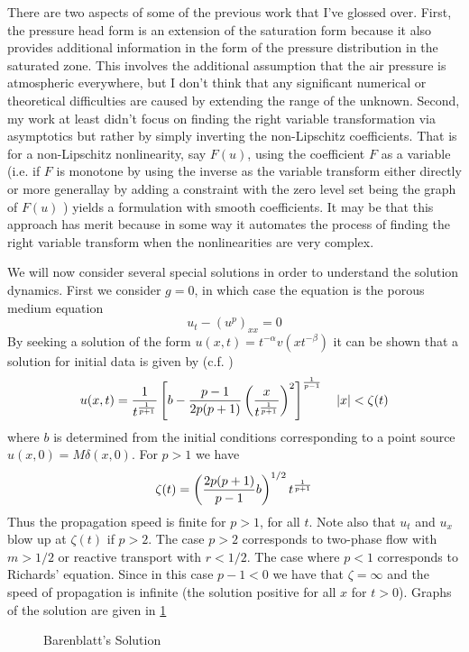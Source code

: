 \documentclass[10pt,dvips,twoside,reqno]{amsart}
\begin{document}
There are two aspects of some of the previous work that I've glossed
over. First, the pressure head form is an extension of the saturation
form because it also provides additional information in the form of
the pressure distribution in the saturated zone. This involves the
additional assumption that the air pressure is atmospheric everywhere,
but I don't think that any significant numerical or theoretical
difficulties are caused by extending the range of the unknown. Second,
my work at least didn't focus on finding the right variable
transformation via asymptotics but rather by simply inverting the
non-Lipschitz coefficients. That is for a non-Lipschitz nonlinearity,
say $F(u)$, using the coefficient $F$ as a variable (i.e. if $F$ is
monotone by using the inverse as the variable transform either
directly or more generallay by adding a constraint with the zero level
set being the graph of $F(u)$ ) yields a formulation with smooth
coefficients. It may be that this approach has merit because in some
way it automates the process of finding the right variable transform
when the nonlinearities are very complex.

 We will now consider several special solutions in order to understand the solution dynamics. First we consider $g=0$, in which case the equation is the porous medium equation
\begin{equation}
  \label{eq:poMe}
  u_t - (u^p)_{xx} = 0
\end{equation}
By seeking a solution of the form $u(x,t) = t^{-\alpha}
v(xt^{-\beta})$ it can be shown that a solution for initial data is given by
(c.f.  \cite{Evans})
  \begin{equation}
    \label{eq:barenBlatt}
    u(x,t) = \frac{1}{t^{\frac{1}{p+1}}}\left[ b - \frac{p-1}{2p(p+1)} \left( \frac{x}{t^{\frac{1}{p+1}}} \right)^2 \right]^{\frac{1}{p-1}} \quad |x| < \zeta(t)
  \end{equation}
  where $b$ is determined from the initial conditions corresponding to a point source $u(x,0) = M \delta(x,0)$. For $p > 1$ we have
  \begin{equation}
    \label{eq:front}
    \zeta(t) = \left( \frac{2p(p+1)}{p-1} b \right)^{1/2} t^{\frac{1}{p+1}}
  \end{equation}
  Thus the propagation speed is finite for $p>1$, for all $t$. Note
  also that $u_t$ and $u_x$ blow up at $\zeta(t)$ if $p > 2$. The case
  $p>2$ corresponds to two-phase flow with $m>1/2$ or reactive
  transport with $r< 1/2$. The case where $p<1$ corresponds to
  Richards' equation. Since in this case $p-1<0$ we have that
  $\zeta=\infty$ and the speed of propagation is infinite (the
  solution positive for all $x$ for $t>0$). Graphs of the solution are  given in \ref{bbSol}
\begin{figure}
\caption{Barenblatt's Solution \label{bbSol}}
\end{figure}
\end{document}
